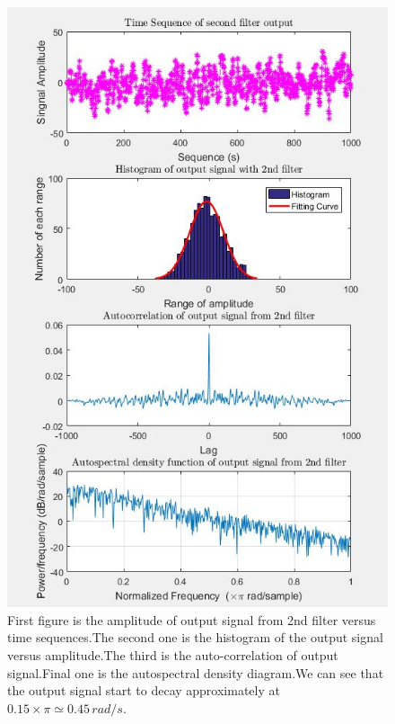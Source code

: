 \documentclass[12pt,a4paper]{article}
\begin{document}
			\begin{figure}[H]
				\centering
				\includegraphics[scale=0.8]{Problem2g}
				\caption[Properties of the output signal from the 2nd filter]{First figure is the amplitude of output signal from 2nd filter versus time sequences.The second one is the histogram of the output signal versus amplitude.The third is the auto-correlation of output signal.Final one is the autospectral density diagram.We can see that the output signal start to decay approximately at $0.15\times\pi\simeq0.45\,rad/s.$}
			\end{figure}
\end{document}
